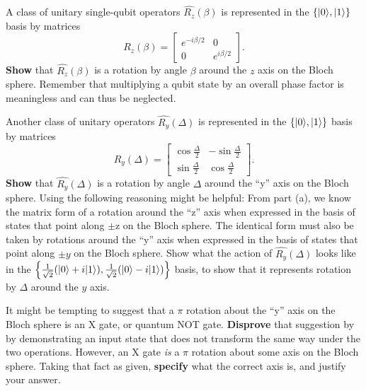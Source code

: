 \documentclass{../phys084}
\begin{document}
\begin{exercise}
  \begin{problems}
  \item A class of unitary single-qubit operators \(\hat{R_z}(\beta)\)
    is represented in the \(\set*{\ket 0, \ket 1}\) basis by matrices
    \[
      R_z(\beta) =
      \begin{bmatrix}
        e^{-i\beta/2} &  0 \\ 0 & e^{i\beta/2}
      \end{bmatrix}.
    \]
    \textbf{Show} that \(\hat{R_z}(\beta)\) is a rotation by angle
    \(\beta\) around the \(z\) axis on the Bloch sphere.  Remember
    that multiplying a qubit state by an overall phase factor is
    meaningless and can thus be neglected.
  \item Another class of unitary operators \(\hat{R_y}(\Delta)\) is
    represented in the \(\set*{\ket 0, \ket 1}\) basis by matrices
    \[
      R_y(\Delta)=
      \begin{bmatrix}
        \cos \frac \Delta 2 & -\sin \frac \Delta 2 \\
        \sin \frac \Delta 2 & \cos \frac \Delta 2
      \end{bmatrix}.
    \]
    \textbf{Show} that \(\hat{R_y}(\Delta)\) is a rotation by angle
    \(\Delta\) around the ``y'' axis on the Bloch sphere.  Using the
    following reasoning might be helpful: From part (a), we know the
    matrix form of a rotation around the ``z'' axis when expressed in
    the basis of states that point along \(\pm\)z on the Bloch sphere.
    The identical form must also be taken by rotations around the
    ``y'' axis when expressed in the basis of states that point along
    \(\pm y\) on the Bloch sphere.  Show what the action of
    \(\hat{R_y}(\Delta)\) looks like in the
    \(\set*{\frac{1}{\sqrt 2} \prn*{\ket 0 + i \ket 1}, \frac{1}{\sqrt
        2} \prn*{\ket 0 - i \ket 1}}\) basis, to show that it
    represents rotation by \(\Delta\) around the \(y\) axis.
  \item It might be tempting to suggest that a \(\pi\) rotation about
    the ``y'' axis on the Bloch sphere is an X gate, or quantum NOT
    gate.  \textbf{Disprove} that suggestion by by demonstrating an
    input state that does not transform the same way under the two
    operations.  However, an X gate \textit{is} a \(\pi\) rotation
    about some axis on the Bloch sphere.  Taking that fact as given,
    \textbf{specify} what the correct axis is, and justify your
    answer.
  \end{problems}
\end{exercise}
\end{document}
